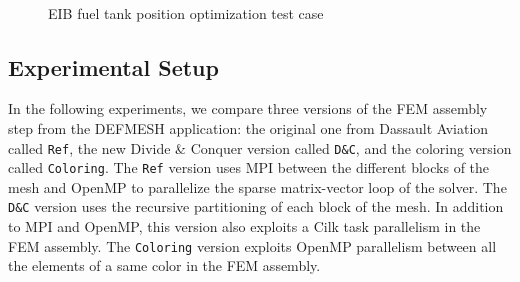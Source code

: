 \documentclass[10pt]{IOS-Book-Article}
\begin{document}
\begin{figure}[htp]
 \\
 \caption{EIB fuel tank position optimization test case}
 \label{fig:reservoir}
\end{figure}

\subsection{Experimental Setup}
In the following experiments, we compare three versions of the FEM assembly step from the DEFMESH application:
the original one from Dassault Aviation called {\tt Ref}, the new Divide \& Conquer version called {\tt D\&C}, and the coloring version called {\tt Coloring}.
The {\tt Ref} version uses MPI between the different blocks of the mesh and OpenMP to parallelize the sparse matrix-vector loop of the solver.
The {\tt D\&C} version uses the recursive partitioning of each block of the mesh.
In addition to MPI and OpenMP, this version also exploits a Cilk task parallelism in the FEM assembly.
The {\tt Coloring} version exploits OpenMP parallelism between all the elements of a same color in the FEM assembly.
\end{document}

